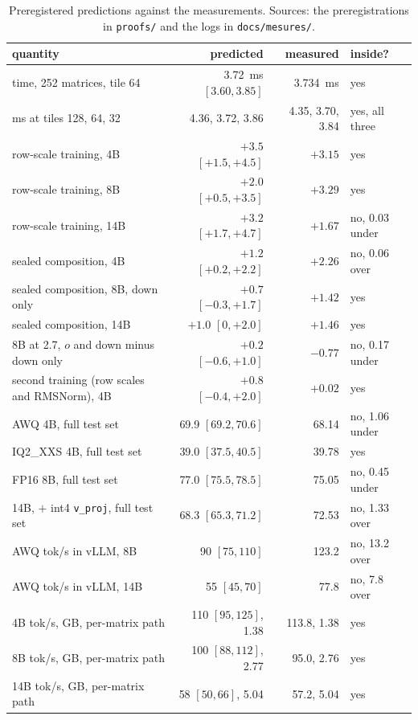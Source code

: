 \begin{table}[!t]
\centering\small\setlength{\tabcolsep}{3pt}
\caption{Preregistered predictions against the measurements. Sources: the
preregistrations in \texttt{proofs/} and the logs in \texttt{docs/mesures/}.}
\label{tab:predictions}
\begin{tabular}{lrrl}
\toprule
quantity & predicted & measured & inside?\\
\midrule
\Tetra{} time, 252 matrices, tile 64 & 3.72~ms $[3.60, 3.85]$ & 3.734~ms & yes\\
\Tetra{} ms at tiles 128, 64, 32 & 4.36, 3.72, 3.86 & 4.35, 3.70, 3.84 & yes, all three\\
row-scale training, 4B & $+3.5$ $[+1.5, +4.5]$ & $+3.15$ & yes\\
row-scale training, 8B & $+2.0$ $[+0.5, +3.5]$ & $+3.29$ & yes\\
row-scale training, 14B & $+3.2$ $[+1.7, +4.7]$ & $+1.67$ & no, 0.03 under\\
sealed composition, 4B & $+1.2$ $[+0.2, +2.2]$ & $+2.26$ & no, 0.06 over\\
sealed composition, 8B, down only & $+0.7$ $[-0.3, +1.7]$ & $+1.42$ & yes\\
sealed composition, 14B & $+1.0$ $[0, +2.0]$ & $+1.46$ & yes\\
8B at 2.7, $o$ and down minus down only & $+0.2$ $[-0.6, +1.0]$ & $-0.77$ & no, 0.17 under\\
second training (row scales and RMSNorm), 4B & $+0.8$ $[-0.4, +2.0]$ & $+0.02$ & yes\\
AWQ 4B, full test set & 69.9 $[69.2, 70.6]$ & 68.14 & no, 1.06 under\\
IQ2\_XXS 4B, full test set & 39.0 $[37.5, 40.5]$ & 39.78 & yes\\
FP16 8B, full test set & 77.0 $[75.5, 78.5]$ & 75.05 & no, 0.45 under\\
14B, \Tetra{} $+$ int4 \texttt{v\_proj}, full test set & 68.3 $[65.3, 71.2]$ & 72.53 & no, 1.33 over\\
AWQ tok/s in vLLM, 8B & 90 $[75, 110]$ & 123.2 & no, 13.2 over\\
AWQ tok/s in vLLM, 14B & 55 $[45, 70]$ & 77.8 & no, 7.8 over\\
4B tok/s, GB, per-matrix path & 110 $[95, 125]$, 1.38 & 113.8, 1.38 & yes\\
8B tok/s, GB, per-matrix path & 100 $[88, 112]$, 2.77 & 95.0, 2.76 & yes\\
14B tok/s, GB, per-matrix path & 58 $[50, 66]$, 5.04 & 57.2, 5.04 & yes\\

\end{tabular}
\end{table}
